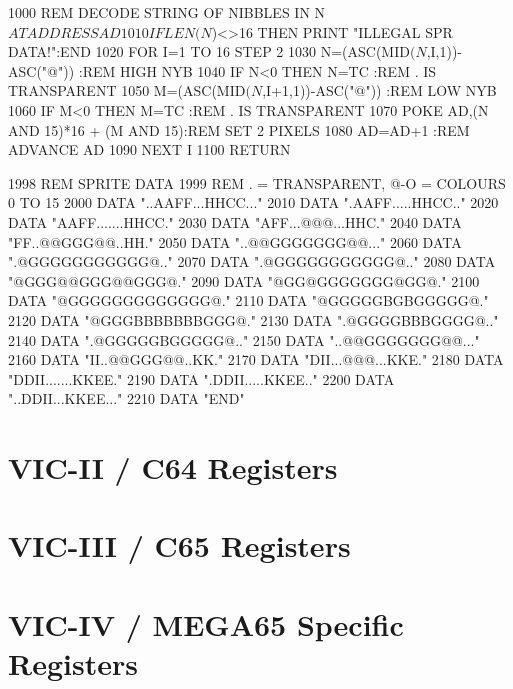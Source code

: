 \begin{screenoutput}
1000 REM DECODE STRING OF NIBBLES IN N$ AT ADDRESS AD
1010 IF LEN(N$)<>16 THEN PRINT "ILLEGAL SPR DATA!":END
1020 FOR I=1 TO 16 STEP 2
1030 N=(ASC(MID$(N$,I,1))-ASC("@"))    :REM HIGH NYB
1040 IF N<0 THEN N=TC                  :REM . IS TRANSPARENT
1050 M=(ASC(MID$(N$,I+1,1))-ASC("@"))  :REM LOW NYB
1060 IF M<0 THEN M=TC                  :REM . IS TRANSPARENT
1070 POKE AD,(N AND 15)*16 + (M AND 15):REM SET 2 PIXELS
1080 AD=AD+1                           :REM ADVANCE AD
1090 NEXT I
1100 RETURN

1998 REM SPRITE DATA
1999 REM . = TRANSPARENT, @-O = COLOURS 0 TO 15
2000 DATA "..AAFF...HHCC..."
2010 DATA ".AAFF.....HHCC.."
2020 DATA "AAFF.......HHCC."
2030 DATA "AFF...@@@...HHC."
2040 DATA "FF..@@GGG@@..HH."
2050 DATA "..@@GGGGGGG@@..."
2060 DATA ".@GGGGGGGGGGG@.."
2070 DATA ".@GGGGGGGGGGG@.."
2080 DATA "@GGG@@GGG@@GGG@."
2090 DATA "@GG@GGGGGGG@GG@."
2100 DATA "@GGGGGGGGGGGGG@."
2110 DATA "@GGGGGBGBGGGGG@."
2120 DATA "@GGGBBBBBBBGGG@."
2130 DATA ".@GGGGBBBGGGG@.."
2140 DATA ".@GGGGGBGGGGG@.."
2150 DATA "..@@GGGGGGG@@..."
2160 DATA "II..@@GGG@@..KK."
2170 DATA "DII...@@@...KKE."
2180 DATA "DDII.......KKEE."
2190 DATA ".DDII.....KKEE.."
2200 DATA "..DDII...KKEE..."
2210 DATA "END"
\end{screenoutput}
\clearpage

\section{VIC-II / C64 Registers}



\section{VIC-III / C65 Registers}



\section{VIC-IV / MEGA65 Specific Registers}


